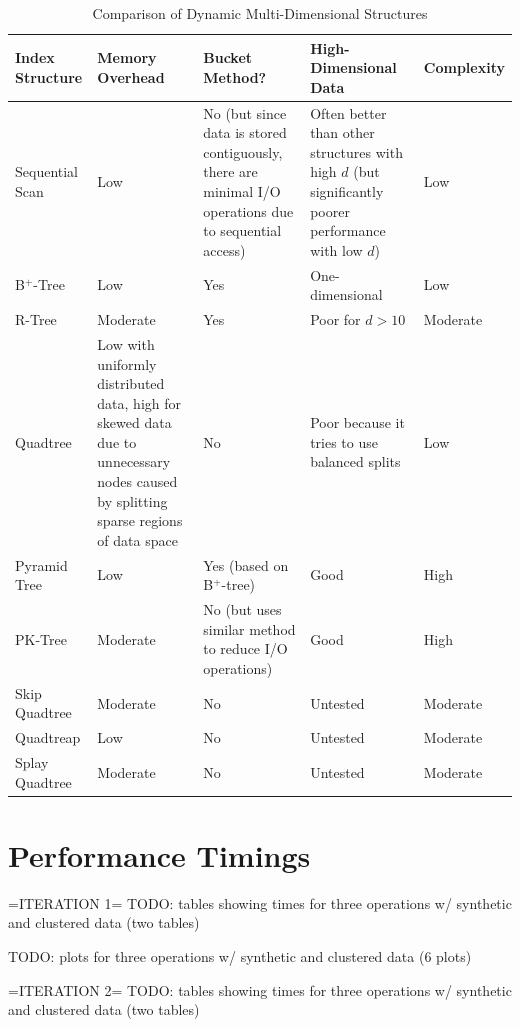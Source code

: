 \begin{landscape}
	\begin{table}
		\centering
		\begin{tabular}{|p{2.8cm}|p{5cm}|p{5cm}|p{5cm}|p{2cm}|}
			\hline
			\textbf{Index Structure} &
			\textbf{Memory Overhead} &
			\textbf{Bucket Method?} &
			\textbf{High-Dimensional Data} &
			\textbf{Complexity} \\
			\hline
			Sequential Scan & Low & No (but since data is stored contiguously, there are minimal I/O operations due to sequential access) & Often better than other structures with high $d$ (but significantly poorer performance with low $d$) & Low \\		
			B${}^{+}$-Tree & Low & Yes & One-dimensional & Low \\
			R-Tree & Moderate & Yes & Poor for $d > 10$ \cite{pyramid-tree} & Moderate \\
			Quadtree & Low with uniformly distributed data, high for skewed data due to unnecessary nodes caused by splitting sparse regions of data space & No & Poor because it tries to use balanced splits \cite{pyramid-tree} & Low \\
			Pyramid Tree & Low & Yes (based on B${}^{+}$-tree) & Good & High \\
			PK-Tree & Moderate & No (but uses similar method to reduce I/O operations) & Good & High \\
			Skip Quadtree & Moderate & No & Untested & Moderate \\
			Quadtreap & Low & No & Untested & Moderate \\
			Splay Quadtree & Moderate & No & Untested & Moderate \\
			\hline
		\end{tabular}
		\caption{Comparison of Dynamic Multi-Dimensional Structures}
		\label{tab:comparison}
	\end{table}

\end{landscape}

\section{Performance Timings}

=ITERATION 1=
TODO: tables showing times for three operations w/ synthetic and clustered data (two tables)

TODO: plots for three operations w/ synthetic and clustered data (6 plots)

=ITERATION 2=
TODO: tables showing times for three operations w/ synthetic and clustered data (two tables)

